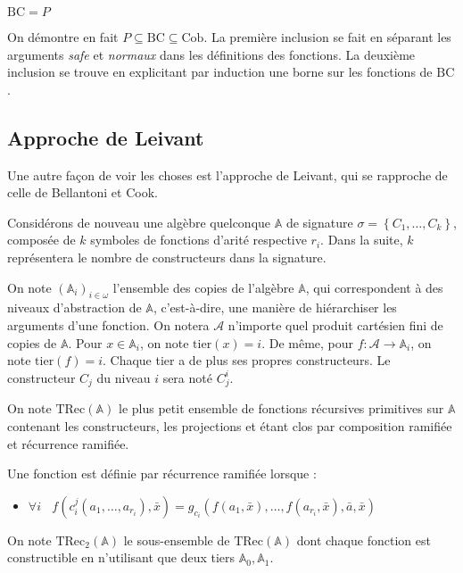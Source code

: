 \documentclass{report}
\newcommand{\bbA}{\mathbb{A}}
\newcommand{\TRec}[1]{\text{TRec}\left(\mathbb{#1}\right)}
\newcommand{\TRecd}[1]{\text{TRec}_{2}\left(\mathbb{#1}\right)}
\begin{document}
			
			\begin{theorem}
				\label{thm:BC_equals_P}
				$\text{BC} = P$
			\end{theorem}
	
			On démontre en fait $P \subseteq \text{BC} \subseteq \text{Cob}$. La première inclusion se fait en séparant les arguments \emph{safe} et \emph{normaux} dans les définitions des fonctions. La deuxième inclusion se trouve en explicitant par induction une borne sur les fonctions de $\text{BC}$. 
		
		
		
		\subsection{Approche de Leivant}
		\label{subsec:Leivant}
	
			Une autre façon de voir les choses est l'approche de Leivant, qui se rapproche de celle de Bellantoni et Cook.
			
			Considérons de nouveau une algèbre quelconque $\bbA$ de signature $\sigma = \left\lbrace C_1, \dots, C_k \right\rbrace$, composée de $k$ symboles de fonctions d'arité respective $r_i$. Dans la suite, $k$ représentera le nombre de constructeurs dans la signature.
			
			\espace
				
			On note $(\bbA_i)_{i\in \omega}$ l'ensemble des copies de l'algèbre $\bbA$, qui correspondent à des niveaux d'abstraction de $\bbA$, c'est-à-dire, une manière de hiérarchiser les arguments d'une fonction. On notera $\mathcal{A}$ n'importe quel produit cartésien fini de copies de $\bbA$. Pour $x\in \bbA_i$, on note $\text{tier}(x) = i$. De même, pour $f : \mathcal{A} \to \bbA_i$, on note $\text{tier}(f) = i$. Chaque tier a de plus ses propres constructeurs. Le constructeur $C_j$ du niveau $i$ sera noté $C_j^i$. 
			
			\begin{definition} 
				\label{def:TRecA}
				On note $\TRec{A}$ le plus petit ensemble de fonctions récursives primitives sur $\bbA$ contenant les constructeurs, les projections et étant clos par composition ramifiée et récurrence ramifiée.
				
				\espace
				
				\hspace{0.1\linewidth}\parbox{0.9\linewidth}{
					\small
					Une fonction est définie par récurrence ramifiée lorsque :
					
					\begin{itemize}
						\item 	$\forall i \:\:\:\:
						f(c_i^j(a_1, \dots, a_{r_i}), \bar{x}) 
						= g_{c_i}\left( f(a_1, \bar{x}), \dots, f(a_{r_i}, \bar{x}), \bar{a}, \bar{x} \right)
						$
					\end{itemize}
				}
				
				\espace
				
				On note $\TRecd{A}$ le sous-ensemble de $\TRec{A}$ dont chaque fonction est constructible en n'utilisant que deux tiers $\bbA_0, \bbA_1$.
			\end{definition}
			
\end{document}
